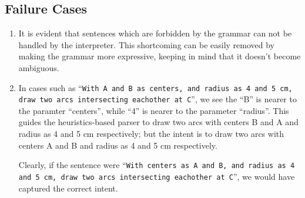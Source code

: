 \def\DevnagVersion{2.15}\documentclass[12pt]{article}
\begin{document}
\subsection{Failure Cases}

\begin{enumerate}

\item It is evident that sentences which are forbidden by the grammar can not be handled by the interpreter. This shortcoming can be easily removed by making the grammar more expressive, keeping in mind that it doesn't become ambiguous.

\item In cases such as ``\texttt{With A and B as centers, and radius as 4 and 5 cm, draw two arcs intersecting eachother at C}'', we see the ``B'' is nearer to the paramter ``centers'', while ``4'' is nearer to the parameter ``radius''. This guides the heuristics-based parser to draw two arcs with centers B and A and radius as 4 and 5 cm respectively; but the intent is to draw two arcs with centers A and B and radius as 4 and 5 cm respectively.

Clearly, if the sentence were ``\texttt{With centers as A and B, and radius as 4 and 5 cm, draw two arcs intersecting eachother at C}'', we would have captured the correct intent.

\end{enumerate}
\end{document}

